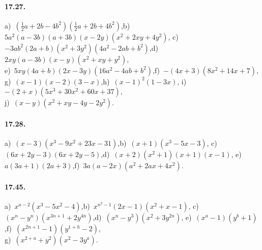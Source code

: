 \paragraph{17.27.} a)~$\left(\frac{1}{2}a+2b-4b^{2}\right)\left(\frac{1}{2}a+2b+4b^{2}\right)$,\quad b)~$5a^{2}(a-3b)(a+3b)(x-2y)(x^{2}+2xy+4y^{2})$,
c)~$-3{ab}^{2}(2a+b)(x^{2}+3y^{2})(4a^{2}-2{ab}+b^{2})$,\quad d)~$2xy(a-3b)(x-y)(x^{2}+xy+y^{2})$,\protect\\
e)~$5xy(4a+b)(2x-3y)(16a^{2}-4{ab}+b^{2})$,\quad f)~$-(4x+3)(8x^{2}+14x+7)$,\quad \protect\\
g)~$(x-1)(x-2)(3-x)$,\quad h)~$(x-1)^{2}(1-3x)$,\quad
i)~$-(2+x)(5x^{3}+30x^{2}+60x+37)$,\protect\\
j)~$(x-y)(x^{2}+xy-4y-2y^{2})$.

\paragraph{17.28.} a)~$(x-3)(x^{3}-9x^{2}+23x-31)$,\quad b)~$(x+1)(x^{3}-5x-3)$,\quad
c)~$(6x+2y-3)(6x+2y-5)$,\quad d)~$(x+2)\left(x^{2}+1\right)(x+1)(x-1)$,\quad
e)~$a(3a+1)(2a+3)$,\quad f)~$3a(a-2x)\left(a^{2}+2ax+4x^{2}\right)$.

\paragraph{17.45.} a)~$x^{a-2}(x^{3}-5x^{2}-4)$,\quad b)~$x^{n^{2}-1}(2x-1)(x^{2}+x-1)$,\quad
c)~$(x^{n}-y^{n})(x^{3n+1}+2y^{4n})$,\quad d)~$(x^{n}-y^{3})(x^{2}+3y^{2n})$,\quad
e)~$(x^{a}-1)(y^{b}+1)$,\quad f)~$(x^{2n+1}-1)(y^{1+h}-2)$,\protect\\
g)~$(x^{2+a}+y^{2})(x^{2}-3y^{a})$.
